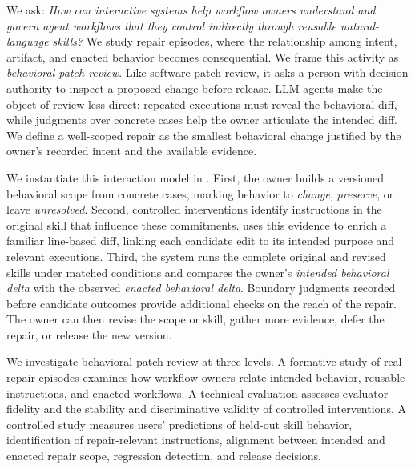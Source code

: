 We ask: \emph{How can interactive systems help workflow owners understand and govern agent workflows that they control indirectly through reusable natural-language skills?} We study repair episodes, where the relationship among intent, artifact, and enacted behavior becomes consequential. We frame this activity as \emph{behavioral patch review}. Like software patch review, it asks a person with decision authority to inspect a proposed change before release. LLM agents make the object of review less direct: repeated executions must reveal the behavioral diff, while judgments over concrete cases help the owner articulate the intended diff. We define a well-scoped repair as the smallest behavioral change justified by the owner's recorded intent and the available evidence.

We instantiate this interaction model in \systemname{}. First, the owner builds a versioned behavioral scope from concrete cases, marking behavior to \emph{change}, \emph{preserve}, or leave \emph{unresolved}. Second, controlled interventions identify instructions in the original skill that influence these commitments. \systemname{} uses this evidence to enrich a familiar line-based diff, linking each candidate edit to its intended purpose and relevant executions. Third, the system runs the complete original and revised skills under matched conditions and compares the owner's \emph{intended behavioral delta} with the observed \emph{enacted behavioral delta}. Boundary judgments recorded before candidate outcomes provide additional checks on the reach of the repair. The owner can then revise the scope or skill, gather more evidence, defer the repair, or release the new version.

We investigate behavioral patch review at three levels. A formative study of real repair episodes examines how workflow owners relate intended behavior, reusable instructions, and enacted workflows. A technical evaluation assesses evaluator fidelity and the stability and discriminative validity of controlled interventions. A controlled study measures users' predictions of held-out skill behavior, identification of repair-relevant instructions, alignment between intended and enacted repair scope, regression detection, and release decisions.

